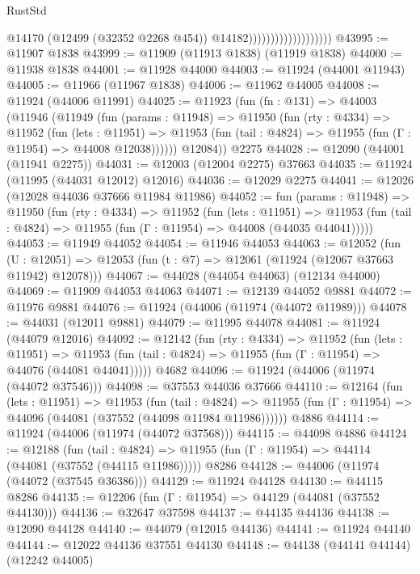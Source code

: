\begin{lexlean}{RustStd}
\begin{coremodule}
{\begin{coremodule}
{{{{{{{{{{{{{{{{{{{{{{{{{{{{{{{{{{{{{{{{{{{{{{{{{{{{{{{{{{{{{{{{{{{{{{{{{{{{{{{{                                          @14170
                                          (@12499 (@32352 @2268 @454))
                                          @14182)))))))))))))))))))
@43995 := @11907 @1838
@43999 := @11909 (@11913 @1838) (@11919 @1838)
@44000 := @11938 @1838
@44001 := @11928 @44000
@44003 := @11924 (@44001 @11943)
@44005 := @11966 (@11967 @1838)
@44006 := @11962 @44005
@44008 := @11924 (@44006 @11991)
@44025 := @11923
    (fun (fn : @131) =>
    @44003
      (@11946
        (@11949
          (fun (params : @11948) =>
          @11950
            (fun (rty : @4334) =>
            @11952
              (fun (lets : @11951) =>
              @11953 (fun (tail : @4824) => @11955 (fun (Γ : @11954) => @44008 @12038))))))
        @12084))
    @2275
@44028 := @12090 (@44001 (@11941 @2275))
@44031 := @12003 (@12004 @2275) @37663
@44035 := @11924 (@11995 (@44031 @12012) @12016)
@44036 := @12029 @2275
@44041 := @12026 (@12028 @44036 @37666 @11984 @11986)
@44052 := fun (params : @11948) =>
  @11950
    (fun (rty : @4334) =>
    @11952
      (fun (lets : @11951) =>
      @11953 (fun (tail : @4824) => @11955 (fun (Γ : @11954) => @44008 (@44035 @44041)))))
@44053 := @11949 @44052
@44054 := @11946 @44053
@44063 := @12052
    (fun (U : @12051) => @12053 (fun (t : @7) => @12061 (@11924 (@12067 @37663 @11942) @12078)))
@44067 := @44028 (@44054 @44063) (@12134 @44000)
@44069 := @11909 @44053 @44063
@44071 := @12139 @44052 @9881
@44072 := @11976 @9881
@44076 := @11924 (@44006 (@11974 (@44072 @11989)))
@44078 := @44031 (@12011 @9881)
@44079 := @11995 @44078
@44081 := @11924 (@44079 @12016)
@44092 := @12142
    (fun (rty : @4334) =>
    @11952
      (fun (lets : @11951) =>
      @11953 (fun (tail : @4824) => @11955 (fun (Γ : @11954) => @44076 (@44081 @44041)))))
    @4682
@44096 := @11924 (@44006 (@11974 (@44072 @37546)))
@44098 := @37553 @44036 @37666
@44110 := @12164
    (fun (lets : @11951) =>
    @11953
      (fun (tail : @4824) =>
      @11955 (fun (Γ : @11954) => @44096 (@44081 (@37552 (@44098 @11984 @11986))))))
    @4886
@44114 := @11924 (@44006 (@11974 (@44072 @37568)))
@44115 := @44098 @4886
@44124 := @12188
    (fun (tail : @4824) => @11955 (fun (Γ : @11954) => @44114 (@44081 (@37552 (@44115 @11986)))))
    @8286
@44128 := @44006 (@11974 (@44072 (@37545 @36386)))
@44129 := @11924 @44128
@44130 := @44115 @8286
@44135 := @12206 (fun (Γ : @11954) => @44129 (@44081 (@37552 @44130)))
@44136 := @32647 @37598
@44137 := @44135 @44136
@44138 := @12090 @44128
@44140 := @44079 (@12015 @44136)
@44141 := @11924 @44140
@44144 := @12022 @44136 @37551 @44130
@44148 := @44138 (@44141 @44144) (@12242 @44005)
}}}}}}}}}}}}}}}}}}}}}}}}}}}}}}}}}}}}}}}}}}}}}}}}}}}}}}}}}}}}}}}}}}}}}}}}}}}}}}}}
\end{coremodule}}
\end{coremodule}
\end{lexlean}
